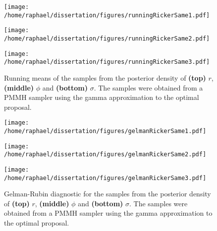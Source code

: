 \documentclass[12pt]{article}
\begin{document}
\begin{appendices}
\clearpage
\thispagestyle{empty}
	\begin{figure}[htb]
		\centering
		\begin{minipage}{0.6\textwidth}
			\centering
			\texttt{[image: /home/raphael/dissertation/figures/runningRickerSame1.pdf]}
		\end{minipage}
		\begin{minipage}{0.6\textwidth}
			\centering
			\texttt{[image: /home/raphael/dissertation/figures/runningRickerSame2.pdf]}
		\end{minipage}
		\begin{minipage}{0.6\textwidth}
			\centering
			\texttt{[image: /home/raphael/dissertation/figures/runningRickerSame3.pdf]}
		\end{minipage}
		\caption[Running means of a run of a PMMH sampler on data simulated from the Ricker model]{Running means of the samples from the posterior density of \textbf{(top)} $r$, \textbf{(middle)} $\phi$ and \textbf{(bottom)} $\sigma$. The samples were obtained from a PMMH sampler using the gamma approximation to the optimal proposal.}
		\label{fig:rmDiag}
	\end{figure}
	
\clearpage
\thispagestyle{empty}
	\begin{figure}[htb]
		\centering
		\begin{minipage}{0.6\textwidth}
			\centering
			\texttt{[image: /home/raphael/dissertation/figures/gelmanRickerSame1.pdf]}
		\end{minipage}
		\begin{minipage}{0.6\textwidth}
			\centering
			\texttt{[image: /home/raphael/dissertation/figures/gelmanRickerSame2.pdf]}
		\end{minipage}
		\begin{minipage}{0.6\textwidth}
			\centering
			\texttt{[image: /home/raphael/dissertation/figures/gelmanRickerSame3.pdf]}
		\end{minipage}
		\caption[Gelman-Rubin diagnostic of the chains of a PMMH sampler on data simulated from the Ricker model]{Gelman-Rubin diagnostic for the samples from the posterior density of \textbf{(top)} $r$, \textbf{(middle)} $\phi$ and \textbf{(bottom)} $\sigma$. The samples were obtained from a PMMH sampler using the gamma approximation to the optimal proposal.}
		\label{fig:gelmanDiag}
	\end{figure}
\clearpage
{}

\end{appendices}
\end{document}
